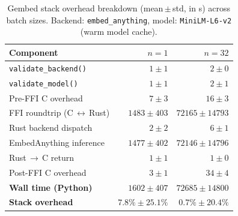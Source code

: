 \begin{table}[t]
  \centering
  \small
  \caption{Gembed stack overhead breakdown (mean\,$\pm$\,std, in \textmu{}s)           across batch sizes. Backend: \texttt{embed\_anything},           model: \texttt{MiniLM\mbox{-}L6\mbox{-}v2} (warm model cache).}
  \label{tab:gembed_overhead}
  \begin{tabular}{lrr}
    \toprule
    \textbf{Component} & $n=1$ & $n=32$ \\
    \midrule
    \texttt{validate\_backend()} & $1\pm1$ & $2\pm0$ \\
    \texttt{validate\_model()} & $1\pm1$ & $2\pm1$ \\
    Pre-FFI C overhead & $7\pm3$ & $16\pm3$ \\
    FFI roundtrip (C\,$\leftrightarrow$\,Rust) & $1483\pm403$ & $72165\pm14793$ \\
    Rust backend dispatch & $2\pm2$ & $6\pm1$ \\
    EmbedAnything inference & $1477\pm402$ & $72146\pm14796$ \\
    Rust\,$\to$\,C return & $1\pm1$ & $1\pm0$ \\
    Post-FFI C overhead & $3\pm1$ & $34\pm4$ \\
    \midrule
    \textbf{Wall time (Python)} & $1602\pm407$ & $72685\pm14800$ \\
    \midrule
    \textbf{Stack overhead} & $7.8\%\pm25.1\%$ & $0.7\%\pm20.4\%$ \\
    \bottomrule
  \end{tabular}
\end{table}
